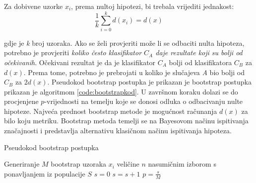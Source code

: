 Za dobivene uzorke $x_i$, prema nultoj hipotezi, bi trebala vrijediti jednakost:
\begin{equation}
\label{eq:jednakost_delta}
\frac{1}{k}\sum_{i=0}^{k}d(x_i) = d(x)
\end{equation}

gdje je \textit{k} broj uzoraka. Ako se želi provjeriti može li se odbaciti nulta hipoteza, potrebno je provjeriti \textit{koliko često klasifikator $C_A$ daje rezultate koji su bolji od očekivanih}. Očekivani rezultat je da je klasifikator $C_A$ bolji od klasifikatora $C_B$ za $d(x)$. Prema tome, potrebno je prebrojati u koliko je slučajeva \textit{A} bio bolji od $C_B$ za $2d(x)$. Pseudokod bootstrap postupka je prikazan je \citep{berg2012empirical} bootstrap postupka prikazan je algoritmom \ref{code:bootstrapkod}. U završnom koraku dolazi se do procjenjene $p$-vrijednosti na temelju koje se donosi odluka o odbacivanju nulte hipoteze. Najveća prednost bootstrap metode je mogućnost računanja $d(x)$ za bilo koju metriku. Bootstrap metoda temelji se na Bayesovom načinu ispitivanja značajnosti i predstavlja alternativu klasičnom načinu ispitivanja hipoteza.

\begin{algorithm}
\caption{Pseudokod bootstrap postupka}
\label{code:bootstrapkod}
\begin{algorithmic}[1]
\State Generiranje $M$ bootstrap uzoraka $x_i$ veličine $n$ nasumičnim izborom s ponavljanjem iz populacije $S$
\State $s=0$
\Repeat 
{}
\State $s=s+1$
\EndIf
{}
\State $p=\frac{s}{M}$
\end{algorithmic}
\end{algorithm}